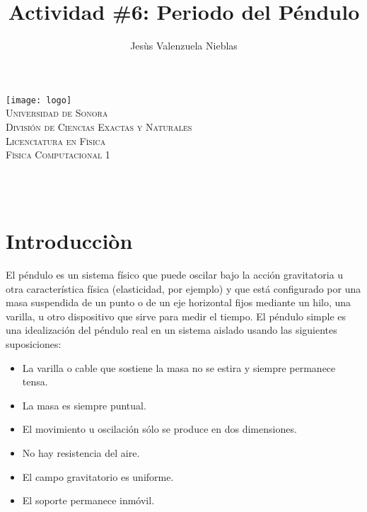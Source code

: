 \documentclass[12pt]{article}
\title{Actividad \#6: Periodo del Péndulo }
\author{\Large Jesùs Valenzuela Nieblas\\}
\date{}
\makeatletter
\let\thetitle\@title
\let\theauthor\@author
\makeatother
\begin{document}

\begin{titlepage}
	\centering
    \vspace*{.5cm}
     \texttt{[image: logo]}\\	%
    \textsc{\Large Universidad de Sonora}\\[1.0 cm]	%
	\textsc{\Large División de Ciencias Exactas y Naturales}\\[.50 cm]
  	\textsc{\Large Licenciatura en Fìsica}\\[.5 cm]
  \textsc{\large Fìsica Computacional 1}\\[1.5 cm]				%
	
	{ \huge \bfseries \thetitle}\\

    \vspace*{3 cm}
	\begin{minipage}{\textwidth}
    \centering
    \theauthor
	\end{minipage}\\[3 cm]

	\vfill
	
\end{titlepage}


\section{Introducciòn}
El péndulo es un sistema físico que puede oscilar bajo la acción gravitatoria u otra característica física (elasticidad, por ejemplo) y que está configurado por una masa suspendida de un punto o de un eje horizontal fijos mediante un hilo, una varilla, u otro dispositivo que sirve para medir el tiempo.
El péndulo simple es una idealización del péndulo real en un sistema aislado usando las siguientes suposiciones:
\begin{itemize}
\item La varilla o cable que sostiene la masa no se estira y siempre permanece tensa.
\item La masa es siempre puntual.
\item El movimiento u oscilación sólo se produce en dos dimensiones.
\item No hay resistencia del aire.
\item El campo gravitatorio es uniforme.
\item El soporte permanece inmóvil.
\end{itemize}
\end{document}
